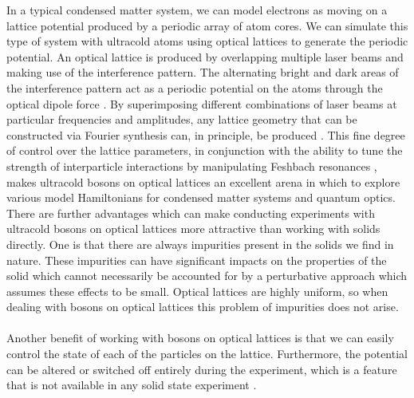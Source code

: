 \documentclass[a4paper,10pt]{article}
\begin{document}
In a typical condensed matter system, we can model electrons as moving on a lattice potential produced by a periodic array of atom cores. 
We can simulate this type of system with ultracold atoms using optical lattices to generate the periodic potential. An optical lattice is 
produced by overlapping multiple laser beams and making use of the interference pattern. The alternating bright and dark areas of the interference
pattern act as a periodic potential on the atoms through the optical dipole force \cite{Bloch2012}. By superimposing different combinations of laser
beams at particular frequencies and amplitudes, any lattice geometry that can be constructed via Fourier synthesis can, in principle, be produced \cite{Bloch2012}.
This fine degree of control over the lattice parameters, in conjunction with the ability to tune the strength of interparticle interactions by 
manipulating Feshbach resonances \cite{Chin2010}, makes ultracold bosons on optical lattices an excellent arena in which to explore various model 
Hamiltonians for condensed matter systems and quantum optics. \\

There are further advantages which can make conducting experiments with ultracold bosons on optical lattices more attractive than working with 
solids directly. One is that there are always impurities present in the solids we find in nature. These impurities can have significant impacts
on the properties of the solid which cannot necessarily be accounted for by a perturbative approach which assumes these effects 
to be small. Optical lattices are highly uniform, so when dealing with bosons on optical lattices this problem of impurities does not arise.\\\\
Another benefit of working with bosons on optical lattices is that we can easily control the state of each of the particles on the lattice. Furthermore, 
the potential can be altered or switched off entirely during the experiment, which is a feature that is not available in any solid state experiment \cite{Morsch2006}.
\end{document}
